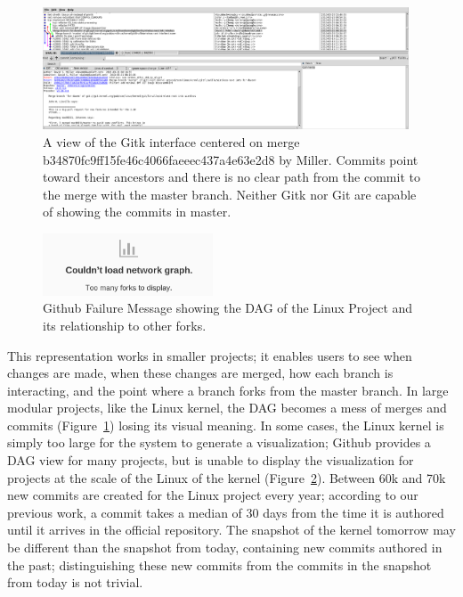 \documentclass[conference, draftclsnofoot, draft]{IEEEtran}
\begin{document}
\begin{figure}
        \centering
        \includegraphics[width=0.97\textwidth]{figures/gitk.png}
        \caption{A view of the Gitk interface centered on merge
          b34870fc9ff15fe46c4066faeeec437a4e63e2d8 by Miller. Commits point toward
          their ancestors and there is no clear path from the commit to the merge
          with the master branch. Neither Gitk nor Git are capable of showing the
          commits in master.}
        \label{fig:gitk}
\end{figure}


\begin{figure}
        \centering
        \includegraphics[width=0.45\textwidth]{figures/github_viewer.png}
        \caption{Github Failure Message showing the DAG of the Linux Project and its
                relationship to other forks.}
        \label{fig:gitfail}
\end{figure}


This representation works in smaller projects; it enables users to see when changes
are made, when these changes are merged, how each branch is interacting, and the
point where a branch forks from the master branch. In large modular projects, like
the Linux kernel, the DAG becomes a mess of merges and commits
(Figure~\ref{fig:gitk}) losing its visual meaning. In some cases, the Linux kernel
is simply too large for the system to generate a visualization; Github provides a
DAG view for many projects, but is unable to display the visualization for projects
at the scale of the Linux of the kernel (Figure~\ref{fig:gitfail}).  Between 60k and
70k new commits are created for the Linux project every year; according to our
previous work\cite{German2015}, a commit takes a median of 30 days from the time it
is authored until it arrives in the official repository. The snapshot of the kernel
tomorrow may be different than the snapshot from today, containing new commits
authored in the past; distinguishing these new commits from the commits in the
snapshot from today is not trivial.
\end{document}
